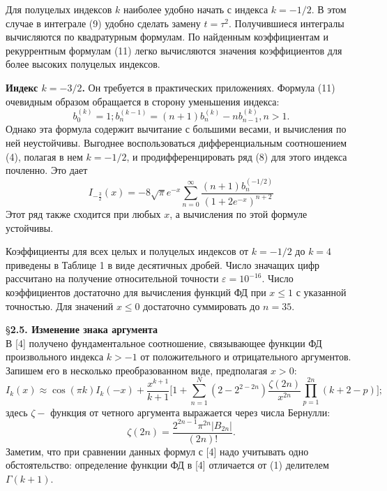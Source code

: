Для полуцелых индексов $k$ наиболее удобно начать с индекса $k = -1/2$. В
этом случае в интеграле (9) удобно сделать замену $t = \tau^2$. Получившиеся
интегралы вычисляются по квадратурным формулам. По найденным
коэффициентам и рекуррентным формулам (11) легко вычисляются значения
коэффициентов для более высоких полуцелых индексов.

\textbf{Индекс $k = -3/2$.} Он требуется в практических приложениях. Формула
(11) очевидным образом обращается в сторону уменьшения индекса:
\begin{equation}
b_0^{(k)}=1;b_n^(k-1)=(n+1)b_n^{(k)}-nb_{n-1}^{(k)}, n > 1.
\end{equation}
Однако эта формула содержит вычитание с большими весами, и вычисления по
ней неустойчивы. Выгоднее воспользоваться дифференциальным
соотношением (4), полагая в нем $k = -1/2$, и продифференцировать ряд (8) для
этого индекса почленно. Это дает
\begin{equation}
I_{-\frac{3}{2}}(x)=-8\sqrt{\pi}e^{-x}\sum\limits_{n=0}^{\infty} \frac{(n+1)b_n^{(-1/2)}}{(1+2e^{-x})^{n+2}}
\end{equation}
Этот ряд также сходится при любых $x$, а вычисления по этой формуле
устойчивы.

Коэффициенты для всех целых и полуцелых индексов от $k = -1/2$ до $k = 4$
приведены в Таблице 1 в виде десятичных дробей. Число значащих цифр
рассчитано на получение относительной точности $\varepsilon = 10^{-16}$. Число
коэффициентов достаточно для вычисления функций ФД при $x \leqslant 1$ с указанной
точностью. Для значений $x \leqslant 0$ достаточно суммировать до $n = 35$.



\S \textbf{2.5. Изменение знака аргумента}
\\

В [4] получено фундаментальное соотношение, связывающее функции ФД
произвольного индекса $k > -1$ от положительного и отрицательного
аргументов. Запишем его в несколько преобразованном виде, предполагая
$x > 0$:
\begin{equation}
I_k(x) \approx \cos(\pi k)I_k(-x)+ \frac{x^{k+1}}{k+1}\Bigg[ 1+\sum\limits_{n=1}^N (2-2^{2-2n}) \frac{\zeta (2n)}{x^{2n}}  \prod\limits_{p=1}^{2n} (k+2-p) \Bigg];
\label{eq:ref_2_5_1}
\end{equation}
здесь $\zeta -$ функция от четного аргумента выражается через числа Бернулли:
\begin{equation}
\zeta(2n)= \frac{2^{2n-1} \pi^{2n} |B_{2n}|}{(2n)!}.
\label{eq:ref_2_5_2}
\end{equation}
Заметим, что при сравнении данных формул с [4] надо учитывать одно
обстоятельство: определение функции ФД в [4] отличается от (1) делителем $\Gamma(k + 1)$.

